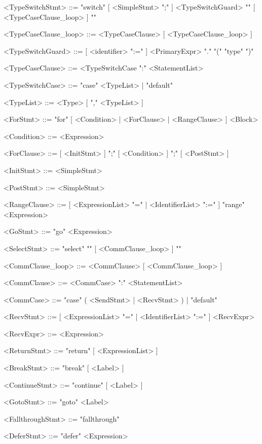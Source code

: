 \documentclass{article}
\begin{document}
\begin{grammar}
        <TypeSwitchStmt>        ::=     "switch" [ <SimpleStmt> ";" ] <TypeSwitchGuard> "{" [ <TypeCaseClause_loop> ] "}"

        <TypeCaseClause_loop>   ::=     <TypeCaseClause> [ <TypeCaseClause_loop> ]

        <TypeSwitchGuard>       ::=     [ <identifier> ":=" ] <PrimaryExpr> "." "(" "type" ")"

        <TypeCaseClause>        ::=     <TypeSwitchCase ":" <StatementList>

        <TypeSwitchCase>        ::=     "case" <TypeList> | "default"

        <TypeList>              ::=     <Type> [ "," <TypeList> ]

        <ForStmt>               ::=     "for" [ <Condition> | <ForClause> | <RangeClause> ] <Block>

        <Condition>             ::=     <Expression>

        <ForClause>             ::=     [ <InitStmt> ] ";" [ <Condition> ] ";" [ <PostStmt> ]

        <InitStmt>              ::=     <SimpleStmt>

        <PostStmt>              ::=     <SimpleStmt>

        <RangeClause>           ::=     [ <ExpressionList> "=" | <IdentifierList> ":=" ] "range" <Expression>

        <GoStmt>                ::=     "go" <Expression>

        <SelectStmt>            ::=     "select" "{" [ <CommClause_loop> ] "}"

        <CommClause_loop>       ::=     <CommClause> [ <CommClause_loop> ]

        <CommClause>            ::=     <CommCase> ":" <StatementList>

        <CommCase>              ::=     "case" ( <SendStmt> | <RecvStmt> ) | "default"

        <RecvStmt>              ::=     [ <ExpressionList> "=" | <IdentifierList> ":=" ] <RecvExpr>

        <RecvExpr>              ::=     <Expression>

        <ReturnStmt>            ::=     "return" [ <ExpressionList> ]

        <BreakStmt>             ::=     "break" [ <Label> ]

        <ContinueStmt>          ::=     "continue" [ <Label> ]

        <GotoStmt>              ::=     "goto" <Label>

        <FallthroughStmt>       ::=     "fallthrough"

        <DeferStmt>             ::= "defer" <Expression>

    \end{grammar}
\end{document}
